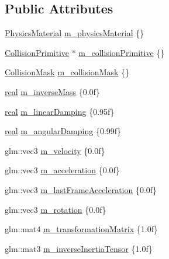 \subsection*{Public Attributes}
\begin{DoxyCompactItemize}
\item 
\mbox{\hyperlink{classr3_1_1_physics_material}{Physics\+Material}} \mbox{\hyperlink{structr3_1_1_rigid_body_def_a390c0e07407b760c2219dd775ac597c9}{m\+\_\+physics\+Material}} \{\}
\item 
\mbox{\hyperlink{classr3_1_1_collision_primitive}{Collision\+Primitive}} $\ast$ \mbox{\hyperlink{structr3_1_1_rigid_body_def_a99f08504496b3687836a7b912086618f}{m\+\_\+collision\+Primitive}} \{\}
\item 
\mbox{\hyperlink{structr3_1_1_collision_mask}{Collision\+Mask}} \mbox{\hyperlink{structr3_1_1_rigid_body_def_af5bb8006b04822cc98d4c29992ba29b1}{m\+\_\+collision\+Mask}} \{\}
\item 
\mbox{\hyperlink{namespacer3_ab2016b3e3f743fb735afce242f0dc1eb}{real}} \mbox{\hyperlink{structr3_1_1_rigid_body_def_a8f5ffeb5e6a8f397e63623f7cd03ebe9}{m\+\_\+inverse\+Mass}} \{0.\+0f\}
\item 
\mbox{\hyperlink{namespacer3_ab2016b3e3f743fb735afce242f0dc1eb}{real}} \mbox{\hyperlink{structr3_1_1_rigid_body_def_afe2d4cfd2d576be94dbabdd415883e3b}{m\+\_\+linear\+Damping}} \{0.\+95f\}
\item 
\mbox{\hyperlink{namespacer3_ab2016b3e3f743fb735afce242f0dc1eb}{real}} \mbox{\hyperlink{structr3_1_1_rigid_body_def_a8510aa8449a8657803d41aa0d1560108}{m\+\_\+angular\+Damping}} \{0.\+99f\}
\item 
glm\+::vec3 \mbox{\hyperlink{structr3_1_1_rigid_body_def_a3acdc6c652745324b72165c6fc42bc39}{m\+\_\+velocity}} \{0.\+0f\}
\item 
glm\+::vec3 \mbox{\hyperlink{structr3_1_1_rigid_body_def_a7f198090401ced879b2e8f8b5baa2a4d}{m\+\_\+acceleration}} \{0.\+0f\}
\item 
glm\+::vec3 \mbox{\hyperlink{structr3_1_1_rigid_body_def_a5c23bea5e32b01e7182b633126fe3d98}{m\+\_\+last\+Frame\+Acceleration}} \{0.\+0f\}
\item 
glm\+::vec3 \mbox{\hyperlink{structr3_1_1_rigid_body_def_a141b8dc66b5bde2f7bb98894313b2e99}{m\+\_\+rotation}} \{0.\+0f\}
\item 
glm\+::mat4 \mbox{\hyperlink{structr3_1_1_rigid_body_def_a5110c4790357fbbfad4d5cc5dd89c4d6}{m\+\_\+transformation\+Matrix}} \{1.\+0f\}
\item 
glm\+::mat3 \mbox{\hyperlink{structr3_1_1_rigid_body_def_a74a00d333ee64b54e8481e7733999006}{m\+\_\+inverse\+Inertia\+Tensor}} \{1.\+0f\}

\end{DoxyCompactItemize}
